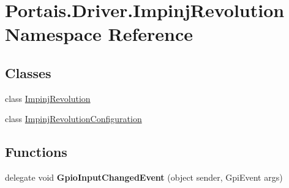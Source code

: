 \hypertarget{namespace_portais_1_1_driver_1_1_impinj_revolution}{}\section{Portais.\+Driver.\+Impinj\+Revolution Namespace Reference}
\label{namespace_portais_1_1_driver_1_1_impinj_revolution}
\subsection*{Classes}
\begin{DoxyCompactItemize}
\item 
class \hyperlink{class_portais_1_1_driver_1_1_impinj_revolution_1_1_impinj_revolution}{Impinj\+Revolution}
\item 
class \hyperlink{class_portais_1_1_driver_1_1_impinj_revolution_1_1_impinj_revolution_configuration}{Impinj\+Revolution\+Configuration}
\end{DoxyCompactItemize}
\subsection*{Functions}
\begin{DoxyCompactItemize}
\item 
delegate void {\bfseries Gpio\+Input\+Changed\+Event} (object sender, Gpi\+Event args)\hypertarget{namespace_portais_1_1_driver_1_1_impinj_revolution_ac26087a284ac7eb870f8ef931922456d}{}\label{namespace_portais_1_1_driver_1_1_impinj_revolution_ac26087a284ac7eb870f8ef931922456d}

\end{DoxyCompactItemize}
